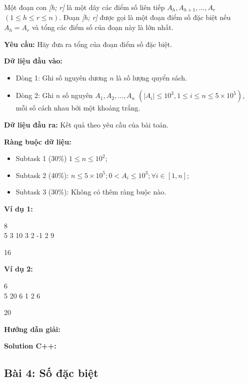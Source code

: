 \documentclass[12pt]{scrartcl}  %
\begin{document}
Một đoạn con \textit{[h; r]} là một dãy các điểm số liên tiếp $A_h, A_{h + 1}, ... , A_r$ $(1 \leq h \leq r \leq n)$. Đoạn \textit{[h; r]} được gọi là một đoạn điểm số đặc biệt nếu $A_h = A_r$ và tổng các điểm số của đoạn này là lớn nhất.

\textbf{Yêu cầu:}
Hãy đưa ra tổng của đoạn điểm số đặc biệt.

\textbf{Dữ liệu đầu vào:}
\begin{itemize}
    \item Dòng 1: Ghi số nguyên dương $n$ là số lượng quyển sách.
    \item Dòng 2: Ghi $n$ số nguyên $A_1, A_2, ... , A_n$ $(|A_i| \leq 10^3, 1 \leq i \leq n \leq 5 \times 10^5)$, mỗi số cách nhau bởi một khoảng trắng.
\end{itemize}

\textbf{Dữ liệu đầu ra:}
Kết quả theo yêu cầu của bài toán.

\textbf{Ràng buộc dữ liệu:}
\begin{itemize}
    \item Subtask 1 (30\%) $1 \leq n \leq 10^2$;
    \item Subtask 2 (40\%): $n \leq 5 \times 10^5; 0 < A_i \leq 10^3; \forall i \in [1, n]$;
    \item Subtask 3 (30\%): Không có thêm ràng buộc nào.
\end{itemize}

\textbf{Ví dụ 1:}
\begin{tcolorbox}[colback=gray!5!white, colframe=blue!50!black, title=Input]
8\\
5 3 10 3 2 -1 2 9
\end{tcolorbox}
\begin{tcolorbox}[colback=gray!5!white, colframe=green!50!black, title=Output]
16
\end{tcolorbox}

\textbf{Ví dụ 2:}
\begin{tcolorbox}[colback=gray!5!white, colframe=blue!50!black, title=Input]
6\\
5 20 6 1 2 6
\end{tcolorbox}
\begin{tcolorbox}[colback=gray!5!white, colframe=green!50!black, title=Output]
20
\end{tcolorbox}

\textbf{Hướng dẫn giải:}

\textbf{Solution C++:}

\subsection{Bài 4: Số đặc biệt}
\end{document}
